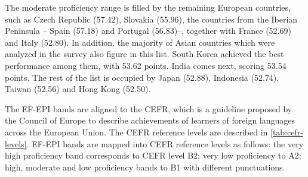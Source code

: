 The moderate proficiency range is filled by the remaining European countries, such as Czech Republic (57.42), Slovakia (55.96), the countries from the Iberian Peninsula -- Spain (57.18) and Portugal (56.83)--, together with France (52.69) and Italy (52.80). In addition, the majority of Asian countries which were analyzed in the survey also figure in this list. South Korea achieved the best performance among them, with 53.62 points. India comes next, scoring 53.54 points. The rest of the list is occupied by Japan (52.88), Indonesia (52.74), Taiwan (52.56) and Hong Kong (52.50).

The \ac{EF-EPI} bands are aligned to the \ac{CEFR}, which is a guideline proposed by the Council of Europe to describe achievements of learners of foreign languages across the European Union. The \ac{CEFR} reference levels are described in \autoref{tab:cefr-levels}. \ac{EF-EPI} bands are mapped into \ac{CEFR} reference levels as follows: the very high proficiency band corresponds to \ac{CEFR} level B2; very low proficiency to A2; high, moderate and low proficiency bands to B1 with different punctuations. 

